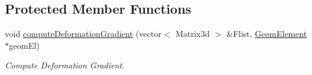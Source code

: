 \subsection*{Protected Member Functions}
\begin{DoxyCompactItemize}
\item 
\hypertarget{classvoom_1_1_mechanics_model_aa44a8b08dc23ea0279ed2bf6b78e56f8}{
void \hyperlink{classvoom_1_1_mechanics_model_aa44a8b08dc23ea0279ed2bf6b78e56f8}{computeDeformationGradient} (vector$<$ Matrix3d $>$ \&Flist, \hyperlink{classvoom_1_1_geom_element}{GeomElement} $\ast$geomEl)}
\label{classvoom_1_1_mechanics_model_aa44a8b08dc23ea0279ed2bf6b78e56f8}

\begin{DoxyCompactList}\small\item\em Compute Deformation Gradient. \item\end{DoxyCompactList}\end{DoxyCompactItemize}
